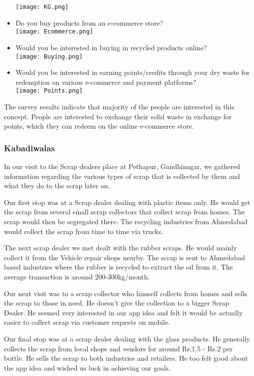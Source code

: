 \documentclass{article}
\begin{document}
\begin{itemize}
    \texttt{[image: KG.png]}
    \item Do you buy products from an e-commerce store?\\
    \texttt{[image: Ecommerce.png]}
    \item Would you be interested in buying in recycled products online?\\
    \texttt{[image: Buying.png]}
    \newpage
    \item Would you be interested in earning points/credits through your dry waste for redemption on various e-commerce and payment platforms?\\
    \texttt{[image: Points.png]}
\end{itemize}
\par The survey results indicate that majority of the people are interested in this concept. People are interested to exchange their solid waste in exchange for points, which they can redeem on the online e-commerce store.

\subsubsection{Kabadiwalas}
\par  In our visit to the Scrap dealers place at Pethapur, Gandhinagar, we gathered information regarding the various types of scrap that is collected by them and what they do to the scrap later on.

\par Our first stop was at a Scrap dealer dealing with plastic items only. He would get the scrap from several small scrap collectors that collect scrap from homes. The scrap would then be segregated there. The recycling industries from Ahmedabad would collect the scrap from time to time via trucks.

\par The next scrap dealer we met dealt with the rubber scraps. He would mainly collect it from the Vehicle repair shops nearby. The scrap is sent to Ahmedabad based industries where the rubber is recycled to extract the oil from it. The average transaction is around 200-300kg/month.
\par Our next visit was to a scrap collector who himself collects from homes and sells the scrap to those in need. He doesn't give the collection to a bigger Scrap Dealer. He seemed very interested in our app idea and felt it would be actually easier to collect scrap via customer requests on mobile.
\par Our final stop was at a scrap dealer dealing with the glass products. He generally collects the scrap from local shops and vendors for around Rs.1.5 - Rs.2 per bottle. He sells the scrap to both industries and retailers. He too felt good about the app idea and wished us luck in achieving our goals.
\end{document}
